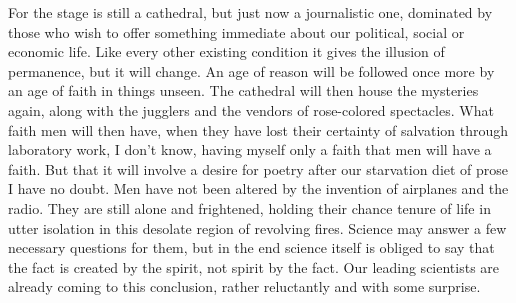\documentclass[9pt,twoside]{extarticle}
\begin{document}
For the stage is still a cathedral, but just now a journalistic one, dominated by those who wish to offer something immediate about our political, social or economic life. Like every other existing condition it gives the illusion of permanence, but it will change. An age of reason will be followed once more by an age of faith in things unseen. The cathedral will then house the mysteries again, along with the jugglers and the vendors of rose-colored spectacles. What faith men will then have, when they have lost their certainty of salvation through laboratory work, I don't know, having myself only a faith that men will have a faith. But that it will involve a desire for poetry after our starvation diet of prose I have no doubt. Men have not been altered by the invention of airplanes and the radio. They are still alone and frightened, holding their chance tenure of life in utter isolation in this desolate region of revolving fires. Science may answer a few necessary questions for them, but in the end science itself is obliged to say that the fact is created by the spirit, not spirit by the fact. Our leading scientists are already coming to this conclusion, rather reluctantly and with some surprise.
\end{document}
